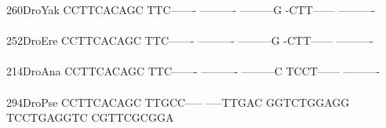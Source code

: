 \documentclass[11pt,twoside,reqno,a4paper]{article}
\begin{document}
{260\hspace*{1\charwidth}DroYak	CCTTCACAGC	TTC-------	----------	---------G	-CTT------	----------	\\
\hspace*{4\charwidth}\hspace*{7\charwidth}\hspace*{1\charwidth}\hspace*{1\charwidth}\hspace*{1\charwidth}\hspace*{1\charwidth}\hspace*{1\charwidth}\hspace*{1\charwidth}\\
252\hspace*{1\charwidth}DroEre	CCTTCACAGC	TTC-------	----------	---------G	-CTT------	----------	\\
\hspace*{4\charwidth}\hspace*{7\charwidth}\hspace*{1\charwidth}\hspace*{1\charwidth}\hspace*{1\charwidth}\hspace*{1\charwidth}\hspace*{1\charwidth}\hspace*{1\charwidth}\\
214\hspace*{1\charwidth}DroAna	CCTTCACAGC	TTC-------	----------	---------C	TCCT------	----------	\\
\hspace*{4\charwidth}\hspace*{7\charwidth}\hspace*{1\charwidth}\hspace*{1\charwidth}\hspace*{1\charwidth}\hspace*{1\charwidth}\hspace*{1\charwidth}\hspace*{1\charwidth}\\
294\hspace*{1\charwidth}DroPse	CCTTCACAGC	TTGCC-----	-----TTGAC	GGTCTGGAGG	TCCTGAGGTC	CGTTCGCGGA	\\
\hspace*{4\charwidth}\hspace*{7\charwidth}\hspace*{1\charwidth}\hspace*{1\charwidth}\hspace*{1\charwidth}\hspace*{1\charwidth}\hspace*{1\charwidth}\hspace*{1\charwidth}\\
}
\end{document}
